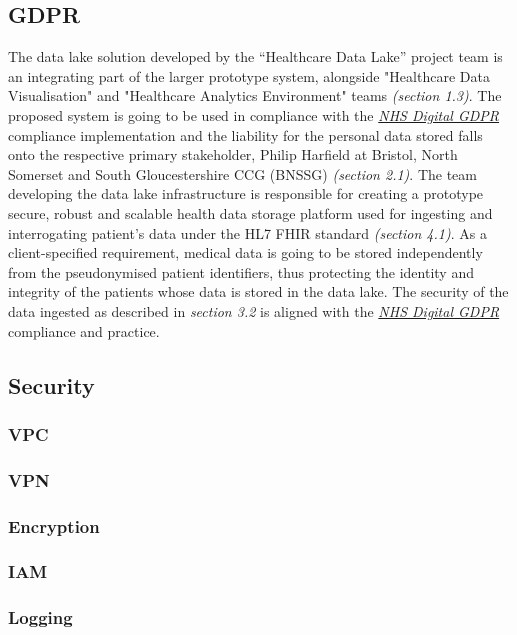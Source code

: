 \documentclass[10pt]{article}
\begin{document}
\subsection{GDPR}
The data lake solution developed by the “Healthcare Data Lake” project team is an integrating part of the larger prototype system, alongside "Healthcare Data Visualisation" and "Healthcare Analytics Environment" teams \emph{(section 1.3)}. The proposed system is going to be used in compliance with the \href{https://digital.nhs.uk/about-nhs-digital/our-work/keeping-patient-data-safe/gdpr}{\emph{NHS Digital GDPR}} compliance implementation and the liability for the personal data stored falls onto the respective primary stakeholder, Philip Harfield at Bristol, North Somerset and South Gloucestershire CCG (BNSSG) \emph{(section 2.1)}. The team developing the data lake infrastructure is responsible for creating a prototype secure, robust and scalable health data storage platform used for ingesting and interrogating patient’s data under the HL7 FHIR standard \emph{(section 4.1)}. As a client-specified requirement, medical data is going to be stored independently from the pseudonymised patient identifiers, thus protecting the identity and integrity of the patients whose data is stored in the data lake. The security of the data ingested as described in \emph {section 3.2} is aligned with the \href{https://digital.nhs.uk/about-nhs-digital/our-work/keeping-patient-data-safe/gdpr}{\emph{NHS Digital GDPR}} compliance and practice.
\subsection{Security}
\subsubsection{VPC}
\subsubsection{VPN}
\subsubsection{Encryption}
\subsubsection{IAM}
\subsubsection{Logging}
\end{document}

